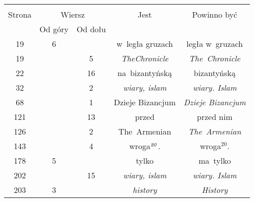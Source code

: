 \documentclass[a4paper,11pt]{article}
\begin{document}
\begin{center}
  \begin{tabular}{|c|c|c|c|c|}
    \hline
    & \multicolumn{2}{c|}{} & & \\
    Strona & \multicolumn{2}{c|}{Wiersz} & Jest
                              & Powinno być \\ \cline{2-3}
    & Od góry & Od dołu & & \\
    \hline
    19  &  6 & & w~legła gruzach & legła w~gruzach \\
    19  & &  5 & \emph{TheChronicle} & \emph{The~Chronicle} \\
    22  & & 16 & na~bizantyńską & bizantyńską \\
    32  & &  2 & \emph{wiary, islam} & \emph{wiary. Islam} \\
    68  & &  1 & Dzieje Bizancjum & \emph{Dzieje Bizancjum} \\
    121 & & 13 & przed & przed nim \\
    126 & &  2 & The~Armenian & \emph{The~Armenian} \\
    143 & &  4 & wroga$^{ \textrm{\emph{20}} }$. & wroga$^{ 20 }$. \\
    178 &  5 & & tylko & ma~tylko \\
    202 & & 15 & \emph{wiary, islam} & \emph{wiary. Islam} \\
    203 &  3 & & \emph{history} & \emph{History} \\
    \hline
  \end{tabular}
\end{center}

\vspace{\spaceTwo}








\end{document}
